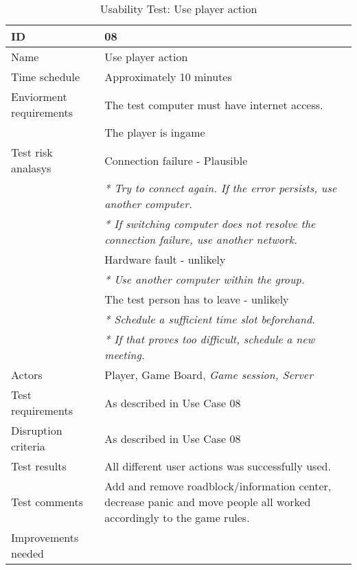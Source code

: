 {\footnotesize
\begin{table}[H]
\begin{tabular}{| p{5cm} | p{10cm} |}\hline
	\textbf{ID}	& \textbf{08} \\ \hline
	Name		& Use player action\\ \hline
	Time schedule	& Approximately 10 minutes\\ \hline
	Enviorment requirements 
		& The test computer must have internet access. \\ 
		& The player is ingame\\ \hline
	Test risk analasys 
		& Connection failure - Plausible \\
		& \emph{* Try to connect again. If the error persists, use another computer.} \\
		& \emph{* If switching computer does not resolve the connection failure, use another network.}\\
		& Hardware fault - unlikely \\
		& \emph{* Use another computer within the group.} \\
		& The test person has to leave - unlikely \\
		& \emph{* Schedule a sufficient time slot beforehand.} \\
		& \emph{* If that proves too difficult, schedule a new meeting.}\\ \hline
	Actors	& Player, Game Board, \emph{Game session, Server}\\ \hline
	Test requirements & As described in Use Case 08 \\ \hline
	Disruption criteria & As described in Use Case 08  \\ \hline
	Test results & All different user actions was successfully used.
		& \\ \hline
	Test comments & Add and remove roadblock/information center, decrease panic and move people all worked accordingly to the game rules.
		& \\ \hline
	Improvements needed
		& \\ \hline
\end{tabular}


\caption{Usability Test: Use player action}
\label{fig:usability_test_8}
\end{table}}






